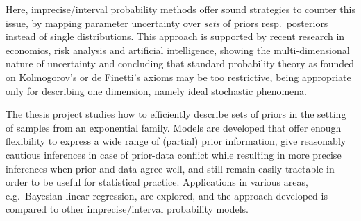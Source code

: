 Here, imprecise/interval probability methods offer sound strategies to counter this issue,
by mapping parameter uncertainty over \emph{sets} of priors resp.\ posteriors instead of single distributions.
This approach is supported by recent research in economics, risk analysis and artificial intelligence,
showing the multi-dimensional nature of uncertainty and concluding that standard probability theory
as founded on Kolmogorov's or de Finetti's axioms may be too restrictive,
being appropriate only for describing one dimension, namely ideal stochastic phenomena.

The thesis project studies how to efficiently describe sets of priors in the setting of samples from an exponential family. 
Models are developed that offer enough flexibility to express a wide range of (partial) prior information,
give reasonably cautious inferences in case of prior-data conflict while resulting in more precise inferences when prior and data agree well,
and still remain easily tractable in order to be useful for statistical practice.
Applications in various areas, e.g.\ Bayesian linear regression, are explored,
and the approach developed is compared to other imprecise/interval probability models.
